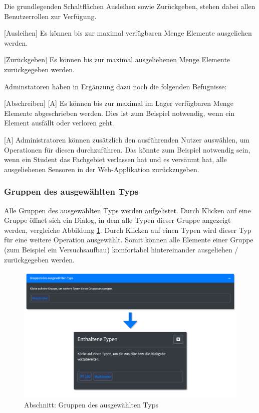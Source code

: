 \documentclass[
]{article}
\begin{document}
Die grundlegenden Schaltflächen Ausleihen sowie Zurückgeben, stehen dabei allen Benutzerrollen zur Verfügung.

{[}Ausleihen{]} Es können bis zur maximal verfügbaren Menge Elemente ausgeliehen werden.

{[}Zurückgeben{]} Es können bis zur maximal ausgeliehenen Menge Elemente zurückgegeben werden.

Adminstatoren haben in Ergänzung dazu noch die folgenden Befugnisse:

{[}Abschreiben{]} {[}A{]} Es können bis zur maximal im Lager verfügbaren Menge Elemente abgeschrieben werden. Dies ist zum Beispiel notwendig, wenn ein Element ausfällt oder verloren geht.

{[}A{]} Administratoren können zusätzlich den ausführenden Nutzer auswählen, um Operationen für diesen durchzuführen. Das könnte zum Beispiel notwendig sein, wenn ein Student das Fachgebiet verlassen hat und es versäumt hat, alle ausgeliehenen Sensoren in der Web-Applikation zurückzugeben.

\hypertarget{gruppen-des-ausgewuxe4hlten-typs}{%
\subsubsection{Gruppen des ausgewählten Typs}\label{gruppen-des-ausgewuxe4hlten-typs}}

Alle Gruppen des ausgewählten Typs werden aufgelistet. Durch Klicken auf eine Gruppe öffnet sich ein Dialog, in dem alle Typen dieser Gruppe angezeigt werden, vergleiche Abbildung \ref{fig:operate-detail-groups}. Durch Klicken auf einen Typen wird dieser Typ für eine weitere Operation ausgewählt. Somit können alle Elemente einer Gruppe (zum Beispiel ein Versuchsaufbau) komfortabel hintereinander ausgeliehen / zurückgegeben werden.

\begin{figure}
\centering
\includegraphics{./img/operate_detail_groups.png}
\caption{\label{fig:operate-detail-groups}Abschnitt: Gruppen des ausgewählten Typs}
\end{figure}
\end{document}
